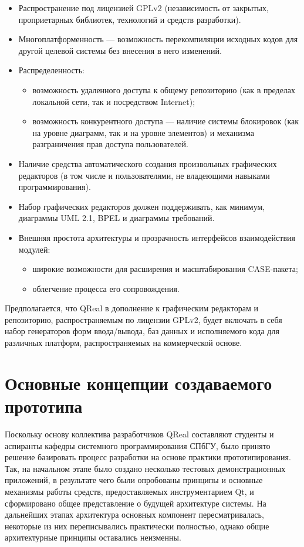 \documentclass[a5paper]{article}
\begin{document}
\begin{itemize}
  \item Распространение под лицензией GPLv2
        (независимость от закрытых, проприетарных библиотек, технологий и
        средств разработки).
  \item Многоплатформенность --- возможность перекомпиляции исходных кодов для
        другой целевой системы без внесения в него изменений.
  \item Распределенность:
  \begin{itemize}
        \item
          возможность удаленного доступа к общему репозиторию (как в пределах
          локальной сети, так и посредством Internet);
        \item возможность конкурентного доступа --- наличие системы блокировок (как на
              уровне диаграмм, так и на уровне элементов) и механизма разграничения
              прав доступа пользователей.
  \end{itemize}
  \item Наличие средства автоматического создания произвольных графических
        редакторов (в том числе и пользователями, не владеющими навыками
        программирования).
  \item Набор графических редакторов должен поддерживать, как
        минимум, диаграммы UML 2.1, BPEL и диаграммы требований.
  \item Внешняя простота архитектуры и прозрачность интерфейсов взаимодействия
        модулей:
  \begin{itemize}
        \item широкие возможности для расширения и масштабирования
          CASE-пакета;
        \item облегчение процесса его сопровождения.
  \end{itemize}
\end{itemize}

Предполагается, что QReal в дополнение к
графическим редакторам и репозиторию, распространяемым по лицензии
GPLv2, будет включать в себя набор
генераторов форм ввода/вывода, баз данных и исполняемого кода для
различных платформ, распространяемых на коммерческой основе.

\section{Основные концепции создаваемого прототипа}

Поскольку основу коллектива разработчиков QReal составляют студенты и аспиранты
кафедры системного программирования СПбГУ, было принято решение базировать
процесс разработки на основе практики прототипирования. Так, на
начальном этапе было создано несколько тестовых демонстрационных
приложений, в результате чего были опробованы принципы и основные
механизмы работы средств, предоставляемых инструментарием Qt, и
сформировано общее представление о будущей архитектуре системы. На
дальнейших этапах архитектура основных компонент пересматривалась,
некоторые из них переписывались практически полностью, однако общие
архитектурные принципы оставались неизменны.
\end{document}
